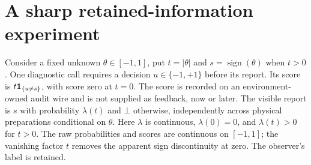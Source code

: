 \section{A sharp retained-information experiment}\label{sec:sharpness}
Consider a fixed unknown $\theta\in[-1,1]$, put $t=|\theta|$ and $s=\operatorname{sign}(\theta)$ when $t>0$. One diagnostic call requires a decision $u\in\{-1,+1\}$ before its report. Its score is $t\mathbf 1_{\{u\ne s\}}$, with score zero at $t=0$. The score is recorded on an environment-owned audit wire and is not supplied as feedback, now or later. The visible report is $s$ with probability $\lambda(t)$ and $\bot$ otherwise, independently across physical preparations conditional on $\theta$. Here $\lambda$ is continuous, $\lambda(0)=0$, and $\lambda(t)>0$ for $t>0$. The raw probabilities and scores are continuous on $[-1,1]$; the vanishing factor $t$ removes the apparent sign discontinuity at zero. The observer's label is retained.

